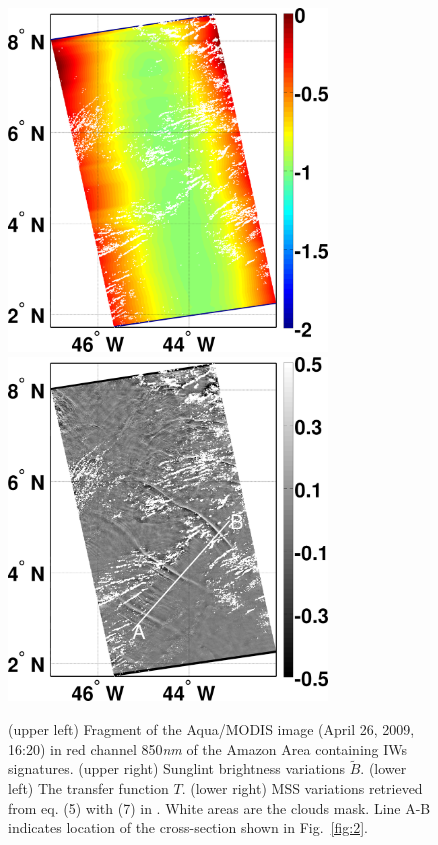 \documentclass[draft,grl]{agutex}
\begin{document}
\begin{figure}
\\
\noindent\includegraphics[width=20pc]{fig1c}
\hfill
\noindent\includegraphics[width=20pc]{fig1d}
\caption{(upper left)  Fragment of the Aqua/MODIS image (April 26, 2009, 16:20) in red channel 850\textit{nm} of the Amazon Area containing IWs signatures. (upper right) Sunglint brightness variations $\tilde{B}$. (lower left) The transfer function $T$. (lower right) MSS variations retrieved from eq. (5) with (7) in \citep{Kudryavtsev2012a}. White areas are the clouds mask. Line A-B indicates location of the cross-section shown in Fig.~\ref{fig:2}.}
\label{fig:1}
\end{figure}
\end{document}
